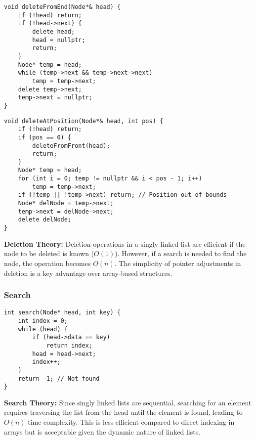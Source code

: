 \begin{lstlisting}[style=cppstyle, caption={Delete from End in Singly Linked List}]
void deleteFromEnd(Node*& head) {
    if (!head) return;
    if (!head->next) {
        delete head;
        head = nullptr;
        return;
    }
    Node* temp = head;
    while (temp->next && temp->next->next)
        temp = temp->next;
    delete temp->next;
    temp->next = nullptr;
}
\end{lstlisting}

\begin{lstlisting}[style=cppstyle, caption={Delete from Position in Singly Linked List}]
void deleteAtPosition(Node*& head, int pos) {
    if (!head) return;
    if (pos == 0) {
        deleteFromFront(head);
        return;
    }
    Node* temp = head;
    for (int i = 0; temp != nullptr && i < pos - 1; i++)
        temp = temp->next;
    if (!temp || !temp->next) return; // Position out of bounds
    Node* delNode = temp->next;
    temp->next = delNode->next;
    delete delNode;
}
\end{lstlisting}

\textbf{Deletion Theory:} Deletion operations in a singly linked list are efficient if the node to be deleted is known (\(O(1)\)). However, if a search is needed to find the node, the operation becomes \(O(n)\). The simplicity of pointer adjustments in deletion is a key advantage over array-based structures.

\subsubsection{Search}
\begin{lstlisting}[style=cppstyle, caption={Search in Singly Linked List}]
int search(Node* head, int key) {
    int index = 0;
    while (head) {
        if (head->data == key)
            return index;
        head = head->next;
        index++;
    }
    return -1; // Not found
}
\end{lstlisting}

\textbf{Search Theory:} Since singly linked lists are sequential, searching for an element requires traversing the list from the head until the element is found, leading to \(O(n)\) time complexity. This is less efficient compared to direct indexing in arrays but is acceptable given the dynamic nature of linked lists.

